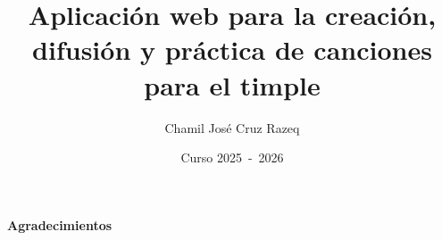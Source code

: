 \documentclass[oneside,12pt]{book}
\title{Aplicación web para la creación, difusión y práctica de canciones para el timple}
\author{Chamil José Cruz Razeq}
\date{Curso 2025~-~2026}
\begin{document}




\newpage
{}
{\Large{\textbf{Agradecimientos}}}


\clearpage

\tableofcontents

\listofalgorithms\listoffigures\listoftables


\clearpage
{}





















\clearpage

\printglossaries
\end{document}
